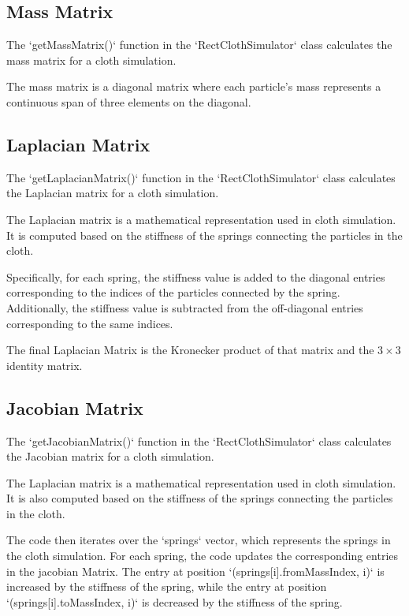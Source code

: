 \documentclass[acmtog]{acmart}
\begin{document}
\subsection{Mass Matrix}

The `getMassMatrix()` function in the `RectClothSimulator` class calculates the mass matrix for a cloth simulation.

The mass matrix is a diagonal matrix where each particle's mass represents a continuous span of three elements on the diagonal.

\subsection{Laplacian Matrix}

The `getLaplacianMatrix()` function in the `RectClothSimulator` class calculates the Laplacian matrix for a cloth simulation.

The Laplacian matrix is a mathematical representation used in cloth simulation. It is computed based on the stiffness of the springs connecting the particles in the cloth. 

Specifically, for each spring, the stiffness value is added to the diagonal entries corresponding to the indices of the particles connected by the spring. Additionally, the stiffness value is subtracted from the off-diagonal entries corresponding to the same indices.

The final Laplacian Matrix is the Kronecker product of that matrix and the $3\times3$ identity matrix.

\subsection{Jacobian Matrix}

The `getJacobianMatrix()` function in the `RectClothSimulator` class calculates the Jacobian matrix for a cloth simulation.

The Laplacian matrix is a mathematical representation used in cloth simulation. It is also computed based on the stiffness of the springs connecting the particles in the cloth. 

The code then iterates over the `springs` vector, which represents the springs in the cloth simulation. For each spring, the code updates the corresponding entries in the jacobian Matrix. The entry at position `(springs[i].fromMassIndex, i)` is increased by the stiffness of the spring, while the entry at position `(springs[i].toMassIndex, i)` is decreased by the stiffness of the spring.
\end{document}
